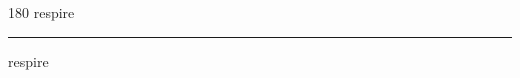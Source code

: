 
\begin{frame}
\begin{center}
\begin{turn}{180}
{\fontsize{2.5cm}{1em}\selectfont respire}
\end{turn}
\vspace{1em}\par  
\hrule
\vspace{1em}\par  
{\fontsize{2.5cm}{1em}\selectfont respire}
\end{center}
\end{frame}
